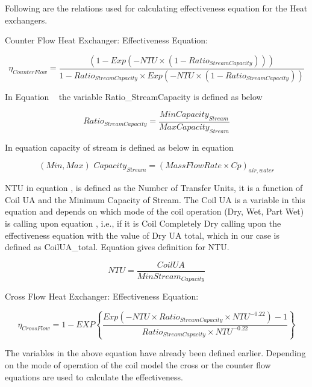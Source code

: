 Following are the relations used for calculating effectiveness equation for the Heat exchangers.

Counter Flow Heat Exchanger: Effectiveness Equation:

\begin{equation}
{\eta_{CounterFlow}} = \frac{{(1 - Exp( - NTU \times (1 - Rati{o_{StreamCapacity}})))}}{{1 - Rati{o_{StreamCapacity}} \times Exp( - NTU \times (1 - Rati{o_{StreamCapacity}}))}}
\end{equation}

In Equation ~ the variable Ratio\_StreamCapacity is defined as below

\begin{equation}
Rati{o_{StreamCapacity}} = \frac{{MinCapacit{y_{Stream}}}}{{MaxCapacit{y_{Stream}}}}
\end{equation}

In equation capacity of stream is defined as below in equation

\begin{equation}
(Min,Max)\,\,Capacit{y_{Stream}} = {(MassFlowRate \times Cp)_{air,water}}
\end{equation}

NTU in equation , is defined as the Number of Transfer Units, it is a function of Coil UA and the Minimum Capacity of Stream. The Coil UA is a variable in this equation and depends on which mode of the coil operation (Dry, Wet, Part Wet) is calling upon equation , i.e., if it is Coil Completely Dry calling upon the effectiveness equation with the value of Dry UA total, which in our case is defined as CoilUA\_total. Equation gives definition for NTU.

\begin{equation}
NTU = \frac{{CoilUA}}{{MinStrea{m_{Capacity}}}}
\end{equation}

Cross Flow Heat Exchanger: Effectiveness Equation:

\begin{equation}
{\eta_{CrossFlow}} = 1 - EXP\left\{ {\frac{{Exp( - NTU \times Rati{o_{StreamCapacity}} \times NT{U^{ - 0.22}}) - 1}}{{Rati{o_{StreamCapacity}} \times NT{U^{ - 0.22}}}}} \right\}
\end{equation}

The variables in the above equation have already been defined earlier. Depending on the mode of operation of the coil model the cross or the counter flow equations are used to calculate the effectiveness.

